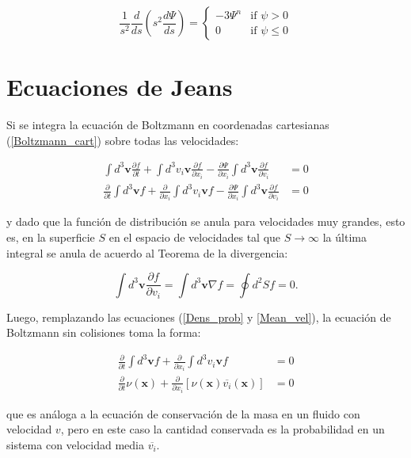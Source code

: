 $$ \frac{1}{s^2} \frac{d}{ds} \left ( s^2 \frac{d \Psi}{ds} \right ) = \left\{
	\begin{array}{ll}
		-3\Psi^n  & \mbox{if } \psi > 0 \\
		0 & \mbox{if } \psi \leq 0
	\end{array}
\right. $$


\section{Ecuaciones de Jeans}

Si se integra la ecuación de Boltzmann en coordenadas cartesianas (\ref{Boltzmann_cart}) sobre todas las velocidades:

\begin{align}
\int d^3\textbf{v} \frac{\partial f}{\partial t} + \int d^3 v_i \textbf{v} \frac{\partial f}{\partial x_i} - \frac{\partial \Psi}{\partial x_i} \int d^3\textbf{v} \frac{\partial f}{\partial v_i} &= 0 \\
\frac{\partial }{\partial t} \int d^3\textbf{v} f + \frac{\partial }{\partial x_i} \int d^3 v_i \textbf{v} f  - \frac{\partial \Psi}{\partial x_i} \int d^3\textbf{v} \frac{\partial f}{\partial v_i} &= 0
\end{align}

y dado que la función de distribución se anula para velocidades muy grandes, esto es, en la superficie $S$ en el espacio de velocidades tal que $S \rightarrow \infty$ la última integral se anula de acuerdo al Teorema de la divergencia:

\begin{equation}
\label{Div_teorem}
\int d^3\textbf{v} \frac{\partial f}{\partial v_i} = \int d^3\textbf{v} \nabla f = \oint d^2 S f = 0.
\end{equation}


Luego, remplazando las ecuaciones (\ref{Dens_prob} y \ref{Mean_vel}), la ecuación de Boltzmann sin colisiones toma la forma:

\begin{align}
\frac{\partial }{\partial t} \int d^3\textbf{v} f + \frac{\partial }{\partial x_i} \int d^3 v_i \textbf{v} f &= 0\\
\label{Cont_dens}
\frac{\partial }{\partial t} \nu(\textbf{x}) + \frac{\partial }{\partial x_i} [\nu(\textbf{x}) \overline{v_i}  (\textbf{x}) ] &= 0
\end{align}

que es análoga a la ecuación de conservación de la masa en un fluido con velocidad $v$, pero en este caso la cantidad conservada es la probabilidad en un sistema con velocidad media $\overline{v_i}$.\\

